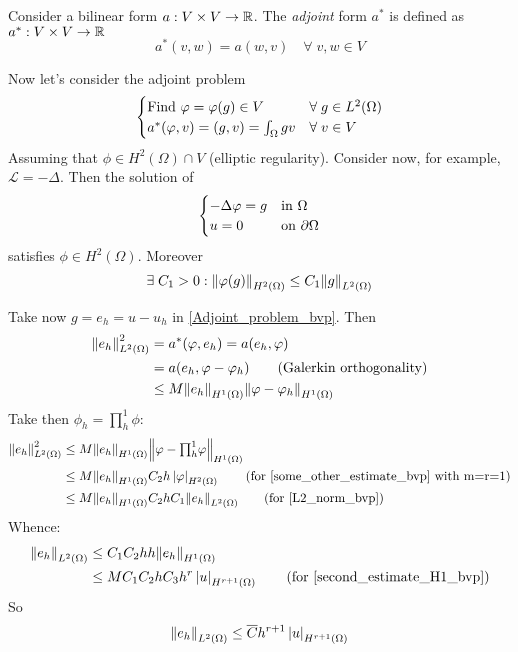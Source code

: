 \begin{definition}
    Consider a bilinear form \(a: V \times V \to \mathbb{R}\). The \textit{adjoint} form \(a^*\) is defined as \(a^*:V \times V \to \mathbb{R}\)
    \[
        a^*(v,w) = a(w,v) \quad \forall \; v,w \in V
    \]
\end{definition}
Now let's consider the adjoint problem 
\begin{equation}
    \begin{cases}
        \text{Find } \varphi = \varphi(g) \in V & \forall \; g \in L^2(\Omega)\\ 
        a^*(\varphi,v) = (g,v) = \int_{\Omega} g v & \forall \; v \in V
    \end{cases}
    \label{Adjoint_problem_bvp}
\end{equation}
Assuming that \(\phi \in H^2(\Omega) \cap V\) (elliptic regularity). Consider now, for example, \(\mathcal{L} = -\Delta\). Then the solution of 
\begin{equation*}
    \begin{cases}
        -\Delta \varphi = g & \text{in } \Omega \\
        u = 0 & \text{on } \partial \Omega
    \end{cases}
\end{equation*}
satisfies \(\phi \in H^2(\Omega)\). Moreover
\begin{equation}
    \exists \; C_1 > 0 : \norm{\varphi(g)}_{H^2(\Omega)} \leq C_1 \norm{g}_{L^2(\Omega)}  \label{L2_norm_bvp}
\end{equation}
    
Take now \(g = e_h = u-u_h\) in \eqref{Adjoint_problem_bvp}. Then
\begin{align*}
    \norm{e_h}^2_{L^2(\Omega)} &= a^*(\phi, e_h) = a(e_h, \phi) \\ 
    &= a(e_h, \phi-\phi_h) \tag{\txt{Galerkin orthogonality}} \\
    &\leq M\norm{e_h}_{H^1(\Omega)}\norm{\phi-\phi_h}_{H^1(\Omega)}
\end{align*}
Take then \(\phi_h = \prod_{h}^{1}\phi\):
\begin{align*}
    \norm{e_h}^2_{L^2(\Omega)} &\leq M\norm{e_h}_{H^1(\Omega)}\norm{\phi - {\textstyle \prod_{h}^{1}}\phi}_{H^1(\Omega)} \\
    &\leq M\honenorm{e_h}C_2 h\seminorm{\phi}{H^2(\Omega)} \tag{for \eqref{some_other_estimate_bvp} with m=r=1} \\
    &\leq M \honenorm{e_h} C_2 h C_1 \ltwonorm{e_h} \tag{for \eqref{L2_norm_bvp}}
\end{align*}
Whence: 
\begin{align*}
    \ltwonorm{e_h} &\leq C_1 C_2 h h \honenorm{e_h} \\
    &\leq M C_1 C_2 h C_3 h^r \seminorm{u}{H^{r+1}(\Omega)} \tag{for \eqref{second_estimate_H1_bvp}}
\end{align*}
So 
\begin{equation}
    \norm{e_h}_{L^2(\Omega)} \leq \overline{C} h^{r+1} \left\lvert u\right\rvert_{H^{r+1}(\Omega)}
\end{equation}